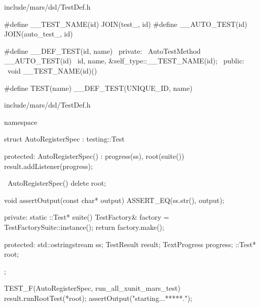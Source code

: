 \begin{content}
\begin{nodiff}{include/mars/dsl/TestDef.h}
\begin{c++}
#define __TEST_NAME(id) JOIN(test_, id)
#define __AUTO_TEST(id) JOIN(auto_test_, id)

#define __DEF_TEST(id, name)                 \
private:                                     \
  AutoTestMethod __AUTO_TEST(id)             \
    {id, name, &self_type::__TEST_NAME(id)}; \
public:                                      \
  void __TEST_NAME(id)()

#define TEST(name) __DEF_TEST(UNIQUE_ID, name)
 \end{c++}
\end{nodiff}

\begin{nodiff}{include/mars/dsl/TestDef.h}
 \begin{c++}
namespace {
  struct AutoRegisterSpec : testing::Test {
  protected:
    AutoRegisterSpec() : progress(ss), root(suite()) {
      result.addListener(progress);
    }

    ~AutoRegisterSpec() {
      delete root;
    }

    void assertOutput(const char* output) {
      ASSERT_EQ(ss.str(), output);
    }

  private:
    static ::Test* suite() {
      TestFactory& factory = TestFactorySuite::instance();
      return factory.make();
    }

  protected:
    std::ostringstream ss;
    TestResult result;
    TextProgress progress;
    ::Test* root;
  };
}

TEST_F(AutoRegisterSpec, run_all_xunit_mars_test) {
  result.runRootTest(*root);
  assertOutput("starting...\n******\nend.\n");
}
 \end{c++}
\end{nodiff}

\end{content}